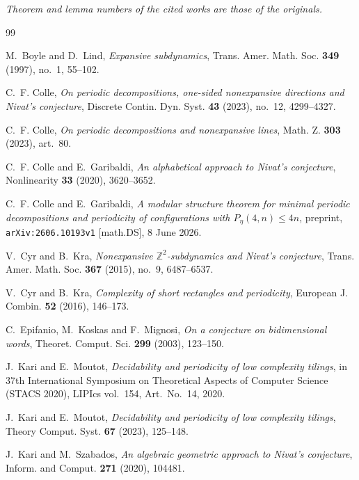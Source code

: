 \documentclass[11pt,reqno]{amsart}
\theoremstyle{plain}
\theoremstyle{definition}
\theoremstyle{remark}
\theoremstyle{plain}
\theoremstyle{remark}
\theoremstyle{definition}
\numberwithin{equation}{section}
\newcommand{\Z}{\mathbb{Z}}
\begin{document}

\smallskip\noindent\emph{Theorem and lemma numbers of the cited works are those
of the originals.}

\clearpage
\begin{thebibliography}{99}

M.~Boyle and D.~Lind,
\emph{Expansive subdynamics},
Trans. Amer. Math. Soc. \textbf{349} (1997), no.~1, 55--102.

C.~F. Colle,
\emph{On periodic decompositions, one-sided nonexpansive directions and Nivat's
conjecture},
Discrete Contin. Dyn. Syst. \textbf{43} (2023), no.~12, 4299--4327.

C.~F. Colle,
\emph{On periodic decompositions and nonexpansive lines},
Math. Z. \textbf{303} (2023), art.~80.

C.~F. Colle and E.~Garibaldi,
\emph{An alphabetical approach to Nivat's conjecture},
Nonlinearity \textbf{33} (2020), 3620--3652.

C.~F. Colle and E.~Garibaldi,
\emph{A modular structure theorem for minimal periodic decompositions and
periodicity of configurations with $P_\eta(4,n)\le 4n$},
preprint, \texttt{arXiv:2606.10193v1} [math.DS], 8 June 2026.

V.~Cyr and B.~Kra,
\emph{Nonexpansive $\Z^2$-subdynamics and Nivat's conjecture},
Trans. Amer. Math. Soc. \textbf{367} (2015), no.~9, 6487--6537.

V.~Cyr and B.~Kra,
\emph{Complexity of short rectangles and periodicity},
European J. Combin. \textbf{52} (2016), 146--173.

C.~Epifanio, M.~Koskas and F.~Mignosi,
\emph{On a conjecture on bidimensional words},
Theoret. Comput. Sci. \textbf{299} (2003), 123--150.

J.~Kari and E.~Moutot,
\emph{Decidability and periodicity of low complexity tilings},
in 37th International Symposium on Theoretical Aspects of Computer Science
(STACS 2020), LIPIcs vol.~154, Art.~No.~14, 2020.

J.~Kari and E.~Moutot,
\emph{Decidability and periodicity of low complexity tilings},
Theory Comput. Syst. \textbf{67} (2023), 125--148.

J.~Kari and M.~Szabados,
\emph{An algebraic geometric approach to Nivat's conjecture},
Inform. and Comput. \textbf{271} (2020), 104481.


\end{thebibliography}
\end{document}
